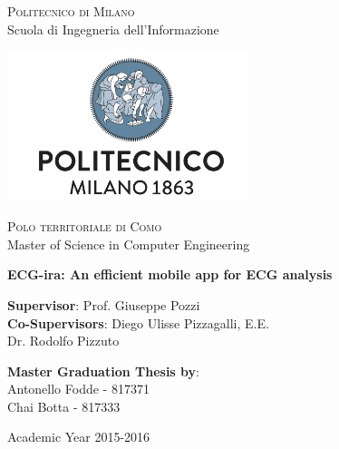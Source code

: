 \thispagestyle{empty}

\begin{center}
	
	\textsc{Politecnico di Milano}\\
	Scuola di Ingegneria dell'Informazione\\  
	
	\par\vskip 0.2cm
	
	\includegraphics[width=7cm]{figures/polimi_logo.png}\\
	
	\par\vskip 0.2cm  
	
	\textsc{Polo territoriale di Como}\\
	Master of Science in Computer Engineering\\  
	
	
	\par\vskip 2cm
	
	\LARGE{ \bf	ECG-ira: An efficient mobile app for ECG analysis}
	
	
	
\end{center}

\par\vskip 1.5cm

\begin{flushleft}
	\textbf{Supervisor}: Prof. Giuseppe Pozzi\\
	\textbf{Co-Supervisors}: Diego Ulisse Pizzagalli, E.E.\\
	\hspace{1in} Dr. Rodolfo Pizzuto \\
\end{flushleft}

\par\vskip 1cm

\begin{flushleft}
	\textbf{Master Graduation Thesis by}: \\
	Antonello Fodde - 817371 \\ 
	Chai Botta - 817333 \\  
\end{flushleft}

\par\vskip 1cm

\begin{center}
	Academic Year 2015-2016
\end{center}




